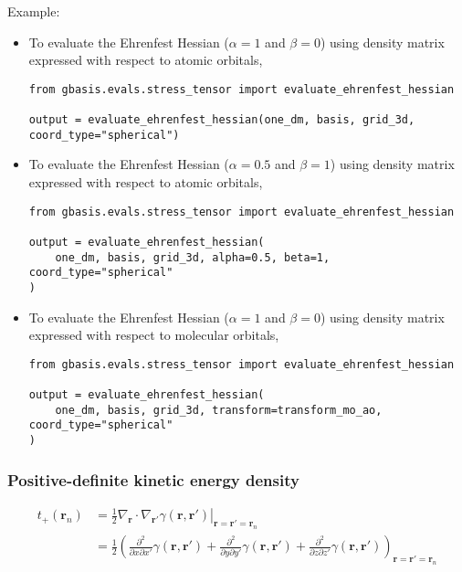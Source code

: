 \documentclass[letterpaper]{article}
\begin{document}
Example:
\begin{itemize}
\item To evaluate the Ehrenfest Hessian ($\alpha=1$ and $\beta=0$)
  using density matrix expressed with respect to atomic orbitals,
  \begin{lstlisting}[xleftmargin=-25pt]
from gbasis.evals.stress_tensor import evaluate_ehrenfest_hessian

output = evaluate_ehrenfest_hessian(one_dm, basis, grid_3d, coord_type="spherical")
\end{lstlisting}
\item To evaluate the Ehrenfest Hessian ($\alpha=0.5$ and $\beta=1$)
  using density matrix expressed with respect to atomic orbitals,
  \begin{lstlisting}[xleftmargin=-25pt]
from gbasis.evals.stress_tensor import evaluate_ehrenfest_hessian

output = evaluate_ehrenfest_hessian(
    one_dm, basis, grid_3d, alpha=0.5, beta=1, coord_type="spherical"
)
\end{lstlisting}
\item To evaluate the Ehrenfest Hessian ($\alpha=1$ and $\beta=0$)
  using density matrix expressed with respect to molecular orbitals,
  \begin{lstlisting}[xleftmargin=-25pt]
from gbasis.evals.stress_tensor import evaluate_ehrenfest_hessian

output = evaluate_ehrenfest_hessian(
    one_dm, basis, grid_3d, transform=transform_mo_ao, coord_type="spherical"
)
\end{lstlisting}
\end{itemize}
\subsubsection{Positive-definite kinetic energy density}
\begin{equation}
  \begin{split}
    t_+ (\mathbf{r}_n)
    &= \frac{1}{2} \left.
      \nabla_{\mathbf{r}} \cdot \nabla_{\mathbf{r}'} \gamma(\mathbf{r}, \mathbf{r}')
    \right|_{\mathbf{r} = \mathbf{r}' = \mathbf{r}_n}\\
    &= \frac{1}{2} \left(
      \frac{\partial^2}{\partial x \partial x'} \gamma(\mathbf{r}, \mathbf{r}')
      + \frac{\partial^2}{\partial y \partial y'} \gamma(\mathbf{r}, \mathbf{r}')
      + \frac{\partial^2}{\partial z \partial z'} \gamma(\mathbf{r}, \mathbf{r}')
    \right)_{\mathbf{r} = \mathbf{r}' = \mathbf{r}_n}\\
  \end{split}
\end{equation}
\end{document}
